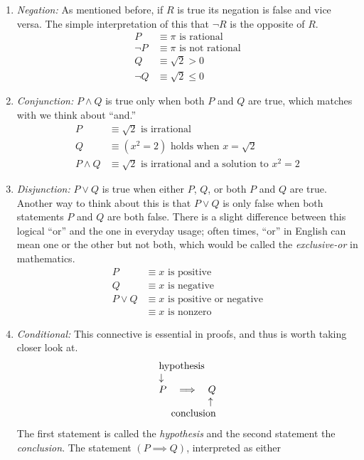 \begin{enumerate}
	\item \emph{Negation:} As mentioned before, if $R$ is true its negation is false and vice versa. The simple interpretation of this that $\neg R$ is the opposite of $R$.
	\begin{align*}
		P &\equiv \text{$\pi$ is rational} \\
		\neg P &\equiv \text{$\pi$ is not rational} \\
		Q &\equiv \sqrt{2} > 0 \\
		\neg Q &\equiv \sqrt{2} \le 0
	\end{align*}
	
	\item \emph{Conjunction:} $P \wedge Q$ is true only when both $P$ and $Q$ are true, which matches with we think about ``and.''
	\begin{align*}
		P &\equiv \text{$\sqrt{2}$ is irrational} \\
		Q &\equiv \text{$(x^2 = 2)$ holds when $x = \sqrt{2}$} \\
		P \wedge Q &\equiv \text{$\sqrt{2}$ is irrational and a solution to $x^2 = 2$}
	\end{align*}

	\item \emph{Disjunction:} $P \lor Q$ is true when either $P$, $Q$, or both $P$ and $Q$ are true. Another way to think about this is that  $P \lor Q$ is only false when both statements $P$ and $Q$ are both false. There is a slight difference between this logical ``or'' and the one in everyday usage; often times, ``or'' in English can mean one or the other but not both, which would be called the \emph{exclusive-or} in mathematics.
	\begin{align*}
		P &\equiv \text{$x$ is positive} \\
		Q &\equiv \text{$x$ is negative} \\
		P \lor Q &\equiv \text{$x$ is positive or negative} \\
		&\equiv \text{$x$ is nonzero}
	\end{align*}
	
	\item \emph{Conditional:} This connective is essential in proofs, and thus is worth taking closer look at.
	\begin{align*}
	\begin{array}{lll}
		\multicolumn{3}{l}{\text{hypothesis}} \\
		\downarrow && \\
		P & \implies & Q \\
		&& \uparrow \\
		\multicolumn{3}{r}{\text{conclusion}}
	\end{array}
	\end{align*}
	The first statement is called the \emph{hypothesis} and the second statement the \emph{conclusion}. The statement $(P \implies Q)$, interpreted as either
	

\end{enumerate}
